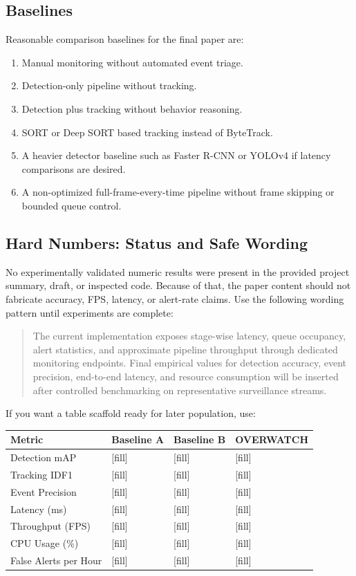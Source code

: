 \documentclass[11pt]{article}
\begin{document}
\subsection{Baselines}
Reasonable comparison baselines for the final paper are:

\begin{enumerate}
\item Manual monitoring without automated event triage.
\item Detection-only pipeline without tracking.
\item Detection plus tracking without behavior reasoning.
\item SORT or Deep SORT based tracking instead of ByteTrack.
\item A heavier detector baseline such as Faster R-CNN or YOLOv4 if latency comparisons are desired.
\item A non-optimized full-frame-every-time pipeline without frame skipping or bounded queue control.
\end{enumerate}

\subsection{Hard Numbers: Status and Safe Wording}
No experimentally validated numeric results were present in the provided project summary, draft, or inspected code. Because of that, the paper content should not fabricate accuracy, FPS, latency, or alert-rate claims. Use the following wording pattern until experiments are complete:

\begin{quote}
The current implementation exposes stage-wise latency, queue occupancy, alert statistics, and approximate pipeline throughput through dedicated monitoring endpoints. Final empirical values for detection accuracy, event precision, end-to-end latency, and resource consumption will be inserted after controlled benchmarking on representative surveillance streams.
\end{quote}

If you want a table scaffold ready for later population, use:

\begin{center}
\begin{tabular}{llll}
\toprule
Metric & Baseline A & Baseline B & OVERWATCH \\
\midrule
Detection mAP & [fill] & [fill] & [fill] \\
Tracking IDF1 & [fill] & [fill] & [fill] \\
Event Precision & [fill] & [fill] & [fill] \\
Latency (ms) & [fill] & [fill] & [fill] \\
Throughput (FPS) & [fill] & [fill] & [fill] \\
CPU Usage (\%) & [fill] & [fill] & [fill] \\
False Alerts per Hour & [fill] & [fill] & [fill] \\
\bottomrule
\end{tabular}
\end{center}
\end{document}
